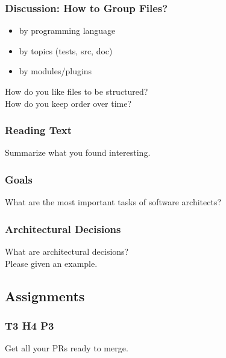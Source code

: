 
\begin{assignment}
	\frametitle{Discussion: How to Group Files?}

	\begin{itemize}
	\item by programming language
	\item by topics (tests, src, doc)
	\item by modules/plugins
	\end{itemize}

	\begin{task}
	How do you like files to be structured? \\
	How do you keep order over time?
	\end{task}
\end{assignment}

\begin{assignment}
	\frametitle{Reading Text}

	\begin{task}
	Summarize what you found interesting.
	\end{task}
\end{assignment}


\begin{assignment}
	\frametitle{Goals}

	\begin{task}
	What are the most important tasks of software architects?
	\end{task}
\end{assignment}


\begin{assignment}
	\frametitle{Architectural Decisions}

	\begin{task}
	What are architectural decisions? \\
	Please given an example.
	\end{task}
\end{assignment}



\subsection{Assignments}

\begin{frame}
	\frametitle{T3 H4 P3}

	\begin{task}
	Get all your PRs ready to merge.
	\end{task}
\end{frame}

